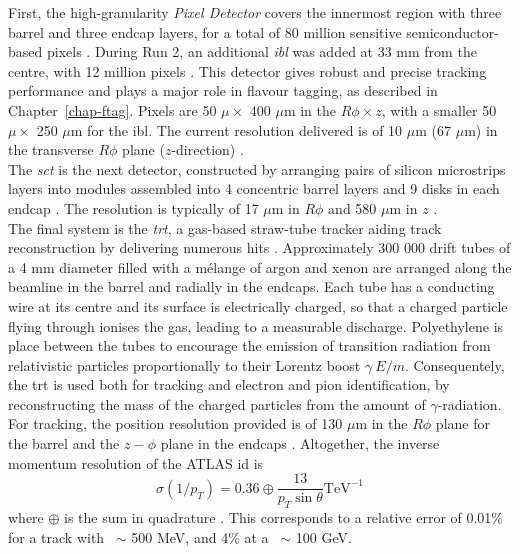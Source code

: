 First, the high-granularity \textit{Pixel Detector} covers the innermost region with three barrel and three endcap layers, for a total of 80 million sensitive semiconductor-based pixels \cite{CERN-LHCC-97-016, Potamianos:2015lar}. During Run 2, an additional \textit{\gls{ibl}} was added at 33 mm from the centre, with 12 million pixels \cite{Capeans:1291633}. This detector gives robust and precise tracking performance and plays a major role in flavour tagging, as described in Chapter~\ref{chap-ftag}. Pixels are 50 $\mu \times$ 400 $\mu$m in the $R\phi \times z$, with a smaller 50 $\mu \times$ 250 $\mu$m for the \gls{ibl}. The current resolution delivered is of 10 $\mu$m (67 $\mu$m) in the transverse $R\phi$ plane ($z$-direction) \cite{Pernegger_2015, ATL-INDET-PUB-2016-001}. \\

The \textit{\gls{sct}} is the next detector, constructed by arranging pairs of silicon microstrips layers into modules assembled into 4 concentric barrel layers and 9 disks in each endcap \cite{AHMAD200798, CERN-LHCC-2017-005}. The resolution is typically of 17 $\mu$m in $R\phi$ and 580 $\mu$m in $z$ \cite{ATLASSCT}. \\

The final system is the \textit{\gls{trt}}, a gas-based straw-tube tracker aiding track reconstruction by delivering numerous hits \cite{TheATLASTRTcollaboration_2008}. Approximately 300 000 drift tubes of a 4 mm diameter filled with a mélange of argon and xenon are arranged along the beamline in the barrel and radially in the endcaps. Each tube has a conducting wire at its centre and its surface is electrically charged, so that a charged particle flying through ionises the gas, leading to a measurable discharge. Polyethylene is place between the tubes to encourage the emission of transition radiation from relativistic particles proportionally to their Lorentz boost $\gamma ~ E / m$. Consequentely, the \gls{trt} is used both for tracking and electron and pion identification, by reconstructing the mass of the charged particles from the amount of $\gamma$-radiation. For tracking, the position resolution provided is of 130 $\mu$m in the $R\phi$ plane for the barrel and the $z-\phi$ plane in the endcaps \cite{Vogel:1537991}. Altogether, the inverse momentum resolution of the ATLAS \gls{id} is
\begin{equation}
  \sigma(1 / p_T) = 0.36 \oplus \frac{13}{p_T \sin\theta} \text{TeV}^{-1}
\end{equation}
where $\oplus$ is the sum in quadrature \cite{TheATLASCollaboration_2008}. This corresponds to a relative error of 0.01\% for a track with \pt\ $\sim$ 500 MeV, and 4\% at a \pt\ $\sim$ 100 GeV.

